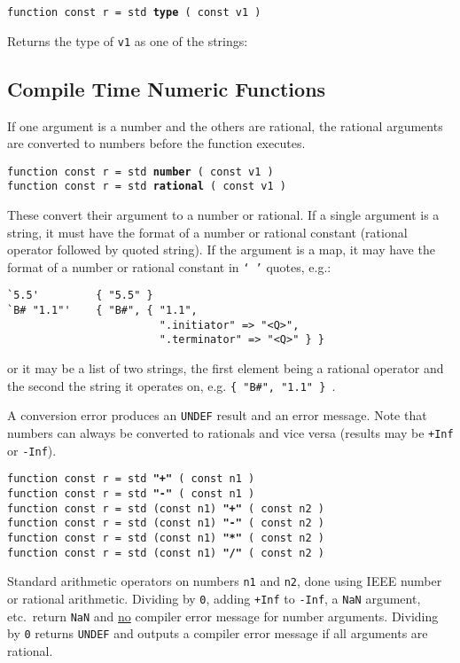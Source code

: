 \documentclass[12pt]{article}
\newcommand{\ttkey}[1]{{\tt \bfseries #1}}
\newenvironment{indpar}[1][0.3in]%
	{\begin{list}{}%
		     {\setlength{\itemsep}{0in}%
		      \setlength{\topsep}{0in}%
		      \setlength{\parsep}{1ex}%
		      \setlength{\labelwidth}{#1}%
		      \setlength{\leftmargin}{#1}%
		      \addtolength{\leftmargin}{\labelsep}}%
	 \item}%
	{\end{list}}
\begin{document}
{\tt function const r = std \ttkey{type} ( const v1 )}
\begin{indpar}
Returns the type of {\tt v1} as one of the strings: \\
\hspace*{0.5in}{\tt
"special" ~  "number" ~ "rational" ~ "string" ~ \tt "map"}
\end{indpar}


\subsection{Compile Time Numeric Functions}

If one argument is a number and the others are rational,
the rational arguments are converted to numbers before
the function executes.

{\tt function const r = std \ttkey{number} ( const v1 )} \\
{\tt function const r = std \ttkey{rational} ( const v1 )}
\begin{indpar}
These convert their argument to a number or rational.  If
a single argument is a string, it must have the format of
a number or rational constant (rational operator followed
by quoted string).
If the argument is a map, it may have the format of
a number or rational constant in {\tt `~'} quotes, e.g.:
\begin{indpar}\begin{verbatim}
`5.5'         { "5.5" }
`B# "1.1"'    { "B#", { "1.1",
                        ".initiator" => "<Q>",
                        ".terminator" => "<Q>" } }
\end{verbatim}\end{indpar}

or it may be a list of two strings, the first element
being a rational operator and the second
the string it operates on, e.g. {\tt \{ "B\#", "1.1" \} }.

A conversion
error produces an {\tt UNDEF} result and an error message.
Note that numbers can always be converted to rationals
and vice versa (results may be {\tt +Inf} or {\tt -Inf}).
\end{indpar}

{\tt function const r = std \ttkey{"+"} ( const n1 )} \\
{\tt function const r = std \ttkey{"-"} ( const n1 )} \\
{\tt function const r = std (const n1) \ttkey{"+"} ( const n2 )} \\
{\tt function const r = std (const n1) \ttkey{"-"} ( const n2 )} \\
{\tt function const r = std (const n1) \ttkey{"*"} ( const n2 )} \\
{\tt function const r = std (const n1) \ttkey{"/"} ( const n2 )}
\begin{indpar}
Standard arithmetic operators on numbers {\tt n1} and {\tt n2},
done using IEEE number or rational arithmetic.
Dividing by {\tt 0},
adding {\tt +Inf} to {\tt -Inf}, a {\tt NaN} argument, etc.~return
{\tt NaN} and \underline{no} compiler error message for number
arguments.  Dividing by {\tt 0} returns {\tt UNDEF} and outputs a
compiler error message if all arguments are rational.
\end{indpar}
\end{document}
